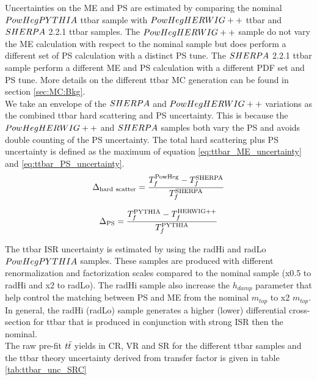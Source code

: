 \indent Uncertainties on the ME and PS are estimated by comparing the nominal $PowHegPYTHIA$ ttbar sample with $PowHegHERWIG++$ ttbar and $SHERPA$ 2.2.1 ttbar samples.  The $PowHegHERWIG++$ sample do not vary the ME calculation with respect to the nominal sample but does perform a different set of PS calculation with a distinct PS tune.  The $SHERPA$ 2.2.1 ttbar sample perform a different ME and PS calculation with a different PDF set and PS tune.  More details on the different ttbar MC generation can be found in section \ref{sec:MC:Bkg}. \\

\indent We take an envelope of the $SHERPA$ and $PowHegHERWIG++$ variations as the combined ttbar hard scattering and PS uncertainty.  This is because the $PowHegHERWIG++$ and $SHERPA$ samples both vary the PS and avoids double counting of the PS uncertainty. The total hard scattering plus PS uncertainty is defined as the maximum of equation \ref{eq:ttbar_ME_uncertainty} and \ref{eq:ttbar_PS_uncertainty}.  \\

    \begin{eqnarray}
      \Delta_{\mathrm{hard~scatter}} = \frac{T_f^{\mathrm{PowHeg}} - T_f^{\mathrm{SHERPA}}}{T_f^{\mathrm{SHERPA}}}
      \label{eq:ttbar_ME_uncertainty}
    \end{eqnarray}

    \begin{eqnarray}
      \Delta_{\mathrm{PS}} = \frac{T_f^{\mathrm{PYTHIA}} - T_f^{\mathrm{HERWIG++}}}{T_f^{\mathrm{PYTHIA}}}
      \label{eq:ttbar_frag_uncertainty}
    \end{eqnarray}

\indent  The ttbar ISR uncertainty is estimated by using the radHi and radLo $PowHegPYTHIA$ samples.  These samples are produced with different renormalization and factorization scales compared to the nominal sample (x0.5 to radHi and x2 to radLo).   The radHi sample also increase the $h_{damp}$ parameter that help control the matching between PS and ME from the nominal $m_{top}$ to x2 $m_{top}$. In general, the radHi (radLo) sample generates a higher (lower) differential cross-section for ttbar that is produced in conjunction with strong ISR then the nominal.  \\
 
\indent The raw pre-fit $t\bar{t}$ yields in CR, VR and SR for the different ttbar samples and the ttbar theory uncertainty derived from transfer factor is given in table \ref{tab:ttbar_unc_SRC}  \\
  
